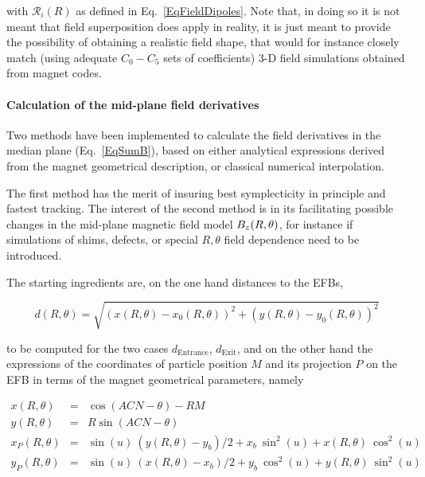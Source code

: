 \noindent with $\mathcal{R}_i(R)$ as defined in Eq.~\ref{EqFieldDipoles}. 
Note that, in doing so it is not meant that field superposition  does apply 
in reality, it is just meant to provide the possibility 
of obtaining a realistic  field shape, that would for instance closely match (using adequate $C_0-C_5$ sets 
of coefficients) 3-D  field simulations obtained from magnet codes. 


\bigskip




\paragraph{Calculation of the  mid-plane field derivatives}

\noindent Two  methods have been implemented to calculate the field derivatives in the median 
plane (Eq.~\ref{EqSumB}), based on 
 either analytical expressions derived from the magnet geometrical description,  or  classical numerical interpolation. 
 
\noindent The first method has the merit of insuring best symplecticity in principle and fastest tracking. 
The interest of the second method is in its  facilitating possible  changes in 
  the mid-plane magnetic field model ${B_z}(R,\theta)$, for instance if simulations of shims, defects, 
or special $R, \theta$  field dependence need to be introduced. 



\bigskip


\bigskip

\noindent The  starting ingredients are, on the one hand distances to the EFBs,  

$$d(R,\theta)=\sqrt{(x(R,\theta)-x_{0}(R,\theta))^2+(y(R,\theta)-y_{0}(R,\theta))^2}$$

\noindent to be computed for the two cases $d_{\textrm{Entrance}}$, $d_{\textrm{Exit}}$, and 
on the other hand the expressions of the coordinates of particle position $M$ and its projection $P$ on 
the EFB in terms of the magnet geometrical parameters, namely 

\begin{eqnarray}
x(R,\theta)&=&\cos (ACN-\theta)-RM   \nonumber \\[-1ex]
y(R,\theta)&=&R\sin (ACN-\theta)   \nonumber \\[-1ex]
x_P(R,\theta)&=&\sin(u)\:  (y(R,\theta) - y_b)/2 + x_b\:  \sin^2(u) + x(R,\theta)\:  \cos^2(u)   \nonumber \\[-1ex]
y_P(R,\theta)&=&\sin(u)\: (x(R,\theta) - x_b)/2 + y_b\:  \cos^2(u) + y(R,\theta) \: \sin^2(u)   \nonumber 
\end{eqnarray}

